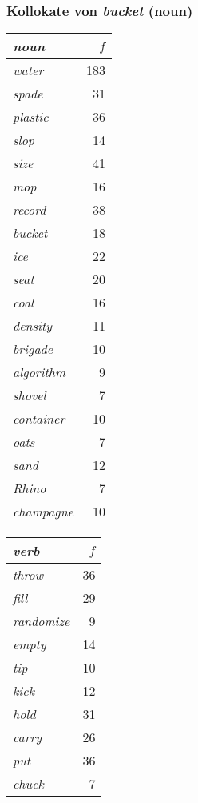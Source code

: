 \documentclass[aspectratio=1610,t]{beamer} %
\begin{document}
\begin{frame}
  \frametitle{Kollokate von \emph{bucket} (noun)}
  \vspace{-.5cm}
  \begin{center}
    \begin{scriptsize}
      \begin{tabular}{>{\itshape}lr}
        \toprule
        \textbf{noun} & $f$ \\
        \midrule
      water & 183 \\
      spade &  31 \\
    plastic &  36 \\
       slop &  14 \\
       size &  41 \\
        mop &  16 \\
     record &  38 \\
     bucket &  18 \\
        ice &  22 \\
       seat &  20 \\
       coal &  16 \\
    density &  11 \\
    brigade &  10 \\
  algorithm &   9 \\
     shovel &   7 \\
  container &  10 \\
       oats &   7 \\
       sand &  12 \\
      Rhino &   7 \\
  champagne &  10 \\
        \bottomrule
      \end{tabular}
      \hspace{5mm}
      \begin{tabular}{>{\itshape}lr}
        \toprule
        \textbf{verb} & $f$ \\
        \midrule
      throw & 36 \\
       fill & 29 \\
  randomize &  9 \\
      empty & 14 \\
        tip & 10 \\
       kick & 12 \\
       hold & 31 \\
      carry & 26 \\
        put & 36 \\
      chuck &  7 \\

\end{tabular}
\end{scriptsize}
\end{center}
\end{frame}
\end{document}
